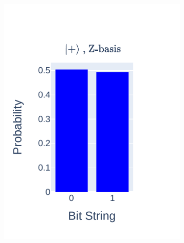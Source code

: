 \documentclass[journal]{IEEEtran}
\begin{document}
\begin{figure}
\begin{subfigure}{0.2\textwidth}
        \includegraphics[scale=0.8, trim={35 20 10 25}, clip]{figures/state_teleport/plus_z_results.pdf}
    \end{subfigure}
    \hfill
    \\
    \begin{subfigure}{0.25\textwidth}
        \centering

\end{subfigure}
\end{figure}
\end{document}
